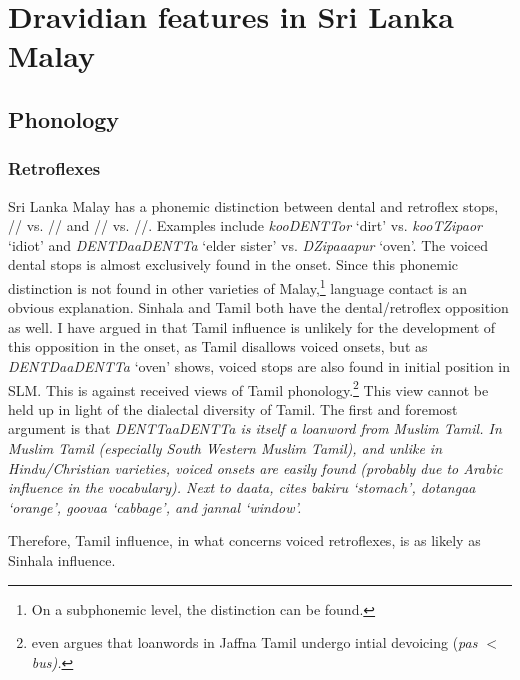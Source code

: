 \documentclass{article}
\renewcommand{\tz}{TZipa}
\renewcommand{\dz}{DZipa}
\renewcommand{\dentt}{DENTT}
\renewcommand{\dentd}{DENTD}
\renewcommand{\phonem}{PHONEM}
\renewcommand{\phonem}[1]{/\textipa{#1}/}
\renewcommand{\trs}[2]{{\em #1\em} `#2'}
\begin{document}
\section{Dravidian features in Sri Lanka Malay} \label{sec:dravidianfeatures}
\subsection{Phonology}
\subsubsection{Retroflexes}
Sri Lanka Malay has a phonemic distinction between dental and retroflex  stops, \phonem{\dentt} vs. \phonem{\dz} and \phonem{\dentt} vs. \phonem{\tz}. Examples include \trs{koo{\dentt}or}{dirt} vs. \trs{koo{\tz}or}{idiot} and \trs{{\dentd}aa{\dentt}a}{elder sister} vs. \trs{{\dz}aapur}{oven}. The voiced dental stops is almost exclusively found in the onset. Since this phonemic distinction is not found in other varieties of Malay,\footnote{On 
 a subphonemic level, the distinction can be found.
}
language contact is an obvious explanation. Sinhala and Tamil both have the dental/retroflex opposition as well.
I have argued in  \citet{Nordhoff2012sinhalainfluence} that Tamil influence is unlikely for the development of this opposition in the onset, as Tamil disallows voiced onsets, but as \trs{{\dentd}aa{\dentt}a}{oven} shows, voiced stops are also found in initial position in SLM. This is against received views of Tamil phonology.\footnote{\citet{Suseendirarajah1973phon}
 even argues that loanwords in Jaffna Tamil undergo intial devoicing (\em pas \em $<$ \em bus\em).
}
This view cannot be held up in light of the dialectal diversity of Tamil. The first and foremost argument is that \em {\dentt}aa{\dentt}a \em is itself a loanword from \em Muslim \em Tamil. In Muslim Tamil (especially South Western Muslim Tamil), and unlike in Hindu/Christian varieties, voiced onsets are easily found (probably due to Arabic influence in the vocabulary). Next to \em daata\em, \citet[74]{Nuhman2007} cites
\trs{bakiru}{stomach},
\trs{dotangaa}{orange},
\trs{goovaa}{cabbage}, and
\trs{jannal}{window}.
 

Therefore, Tamil influence, in what concerns voiced retroflexes, is as likely as Sinhala influence. 
\end{document}
